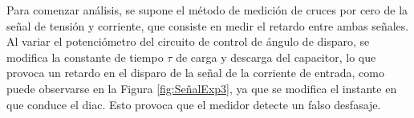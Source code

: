 Para comenzar análisis, se supone el método de medición de cruces 
por cero de la señal de tensión y corriente, que consiste en medir el retardo entre 
ambas señales.
Al variar el potenciómetro del circuito de control de ángulo de disparo, se modifica la constante 
de tiempo $\tau$ de carga y descarga del capacitor, lo que provoca un retardo en el disparo de la 
señal de la corriente de entrada, como puede observarse en la Figura \ref{fig:SeñalExp3}, ya que 
se modifica el instante en que conduce el diac. Esto provoca que el medidor detecte un falso desfasaje. 
















